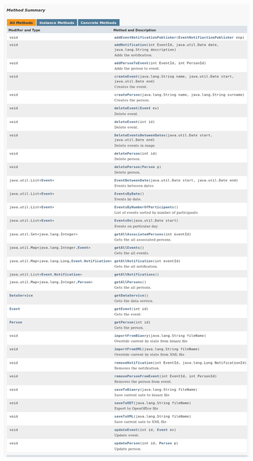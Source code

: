 \documentclass[a4paper,12pt]{article}
\begin{document}
\begin{minipage}{0.75\textwidth}

    \includegraphics[width=\textwidth]{./screen/logicLayer/LogicLayerImpl.png}
    \label{LogicLayerImpl}

\end{minipage}
\end{document}
